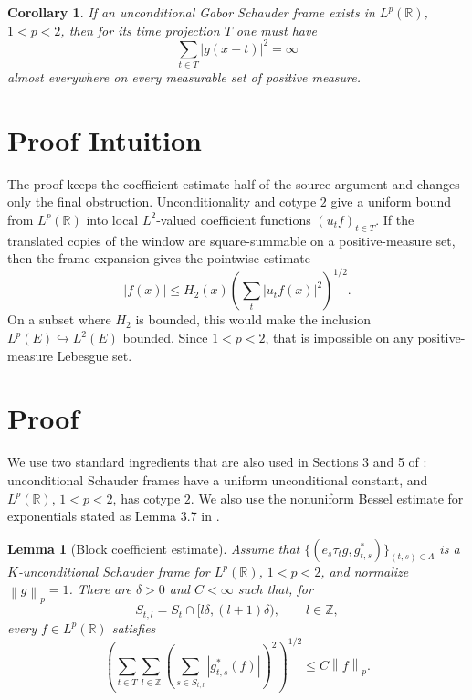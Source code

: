 \documentclass[11pt]{article}
\newtheorem{lemma}{Lemma}
\newtheorem{corollary}{Corollary}
\newcommand{\R}{\mathbb{R}}
\newcommand{\LambdaSet}{\Lambda}
\newcommand{\TT}{T}
\newcommand{\SSS}{S}
\newcommand{\norm}[1]{\left\lVert #1 \right\rVert}
\begin{document}
\begin{corollary}
\label{cor:necessary}
If an unconditional Gabor Schauder frame exists in \(L^p(\R)\), \(1<p<2\),
then for its time projection \(\TT\) one must have
\[
  \sum_{t\in\TT}|g(x-t)|^2=\infty
\]
almost everywhere on every measurable set of positive measure.
\end{corollary}

\section*{Proof Intuition}

The proof keeps the coefficient-estimate half of the source argument and
changes only the final obstruction.  Unconditionality and cotype \(2\) give a
uniform bound from \(L^p(\R)\) into local \(L^2\)-valued coefficient functions
\((u_t f)_{t\in\TT}\).  If the translated copies of the window are
square-summable on a positive-measure set, then the frame expansion gives the
pointwise estimate
\[
  |f(x)|\le H_2(x)\left(\sum_t |u_t f(x)|^2\right)^{1/2}.
\]
On a subset where \(H_2\) is bounded, this would make the inclusion
\(L^p(E)\hookrightarrow L^2(E)\) bounded.  Since \(1<p<2\), that is impossible
on any positive-measure Lebesgue set.

\section*{Proof}

We use two standard ingredients that are also used in Sections 3 and 5 of
\cite{LTGabor}: unconditional Schauder frames have a uniform unconditional
constant, and \(L^p(\R)\), \(1<p<2\), has cotype \(2\).  We also use the
nonuniform Bessel estimate for exponentials stated as Lemma 3.7 in
\cite{LTGabor}.

\begin{lemma}[Block coefficient estimate]
\label{lem:block}
Assume that
\(\{(e_s\tau_tg,g^*_{t,s})\}_{(t,s)\in\LambdaSet}\) is a
\(K\)-unconditional Schauder frame for \(L^p(\R)\), \(1<p<2\), and normalize
\(\norm{g}_p=1\).  There are \(\delta>0\) and \(C<\infty\) such that, for
\[
  \SSS_{t,l}=\SSS_t\cap[l\delta,(l+1)\delta),\qquad l\in\mathbb Z,
\]
every \(f\in L^p(\R)\) satisfies
\[
 \left(\sum_{t\in\TT}\sum_{l\in\mathbb Z}
   \left(\sum_{s\in\SSS_{t,l}} |g^*_{t,s}(f)|\right)^2
 \right)^{1/2}
 \le C\norm{f}_p .
\]
\end{lemma}
\end{document}

